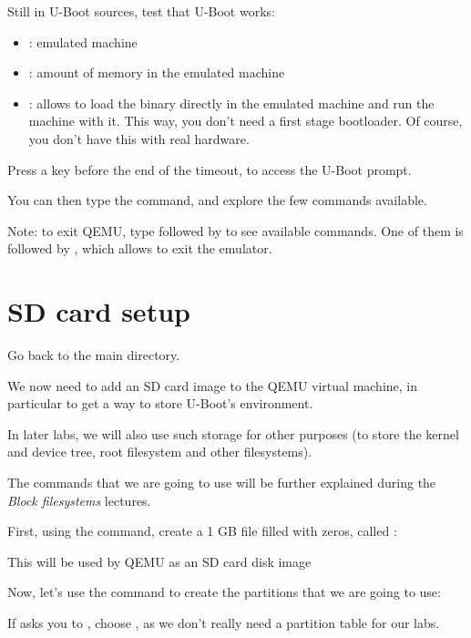 Still in U-Boot sources, test that U-Boot works:


\begin{itemize}
\item {}: emulated machine
\item {}: amount of memory in the emulated machine
\item {}: allows to load the binary directly in the emulated
      machine and run the machine with it. This way, you don't
      need a first stage bootloader. Of course, you don't
      have this with real hardware.
\end{itemize}

Press a key before the end of the timeout, to access the U-Boot prompt.

You can then type the  command, and explore the few commands
available.

Note: to exit QEMU, type \code{[Ctrl][a]} followed by \code{[h]}
to see available commands. One of them is \code{[Ctrl][a]} followed by
\code{[x]}, which allows to exit the emulator.

\section{SD card setup}

Go back to the main  directory.

We now need to add an SD card image to the QEMU virtual machine,
in particular to get a way to store U-Boot's environment.

In later labs, we will also use such storage for other purposes
(to store the kernel and device tree, root filesystem and other
filesystems).

The commands that we are going to use will be further explained
during the {\em Block filesystems} lectures.

First, using the  command, create a 1 GB file
filled with zeros, called :


This will be used by QEMU as an SD card disk image

Now, let's use the  command to create the partitions that
we are going to use:


If  asks you to , choose
, as we don't really need a  partition table for
our labs.

